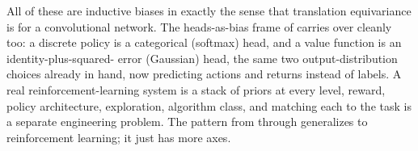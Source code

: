 All of these are inductive biases in exactly the sense that translation
equivariance is for a convolutional network. The heads-as-bias frame of
 carries over cleanly too: a discrete policy is a
categorical (softmax) head, and a value function is an identity-plus-squared-
error (Gaussian) head, the same two output-distribution choices already in
hand, now predicting actions and returns instead of labels. A real
reinforcement-learning system is a stack of priors at every level, reward,
policy architecture, exploration, algorithm class, and matching each to the
task is a separate engineering problem. The pattern from 
through  generalizes to reinforcement learning; it just
has more axes.
